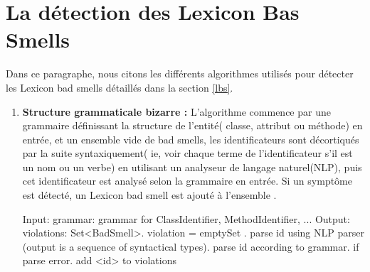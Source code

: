 \section{La détection des Lexicon Bas Smells }
Dans ce paragraphe, nous citons les différents algorithmes utilisés pour détecter les Lexicon bad smells détaillés dans la section \ref{lbs}. 
\begin{enumerate}
\item \textbf{Structure grammaticale bizarre :}
L'algorithme commence par une grammaire définissant la structure de l'entité( classe, attribut ou méthode) en entrée, et un ensemble vide de bad smells, les identificateurs sont décortiqués par la suite syntaxiquement( ie, voir chaque terme de l'identificateur s'il est un nom ou un verbe) en utilisant un analyseur de langage naturel(NLP), puis cet identificateur est analysé selon la grammaire en entrée. Si un symptôme est détecté, un Lexicon bad smell est ajouté à l'ensemble \cite{abebe2009lexicon}.
\begin{framed}
  {\selectfont  
Input:\newline
 grammar: grammar for ClassIdentifier, MethodIdentifier, ...\newline
 Output:\newline
 violations: Set<BadSmell>. violation = emptySet . parse id using NLP parser (output is a sequence of syntactical types). parse id according to grammar. if parse error.    add <id> to violations\newline
 }
\end{framed}
\newline


\end{enumerate}
